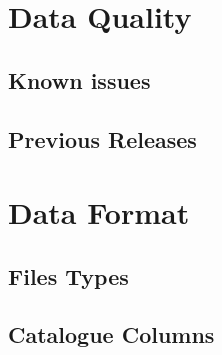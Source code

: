 \documentclass[a4paper,10pt]{article}
\begin{document}
\section{Data Quality}

\subsection{Known issues}

\subsection{Previous Releases}

\section{Data Format}

\subsection{Files Types}

\subsection{Catalogue Columns}
\end{document}
